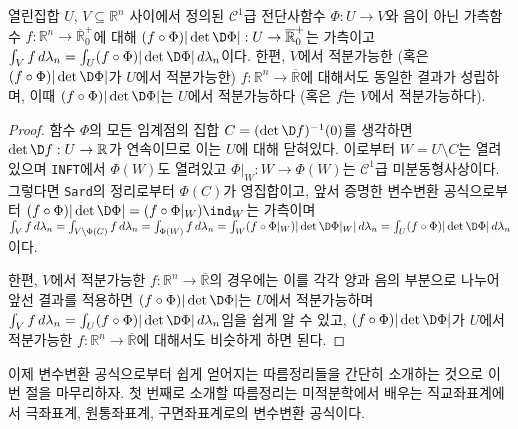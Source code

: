 \begin{corollary}
    열린집합 $U,\,V\subseteq\mathbb{R}^n$ 사이에서 정의된 $\mathcal{C}^1$급 전단사함수 $\Phi:U\to V$와 음이 아닌 가측함수 $f:\mathbb{R}^n\to\overline{\mathbb{R}}^+_0$에 대해 $(f\circ\Phi)|\det\D\Phi|:U\to\overline{\mathbb{R}}^+_0$는 가측이고 $\int_V f\,d\lambda_n=\int_U(f\circ\Phi)|\det\D\Phi|\,d\lambda_n$이다. 한편, $V$에서 적분가능한 (혹은 $(f\circ\Phi)|\det\D\Phi|$가 $U$에서 적분가능한) $f:\mathbb{R}^n\to\overline{\mathbb{R}}$에 대해서도 동일한 결과가 성립하며, 이때 $(f\circ\Phi)|\det\D\Phi|$는 $U$에서 적분가능하다 (혹은 $f$는 $V$에서 적분가능하다).
\end{corollary}

\begin{proof}
    함수 $\Phi$의 모든 임계점의 집합 $C=(\det\D f)^{-1}(0)$를 생각하면 $\det\D f:U\to\mathbb{R}$가 연속이므로 이는 $U$에 대해 닫혀있다. 이로부터 $W=U\setminus C$는 열려있으며 \texttt{INFT}에서 $\Phi(W)$도 열려있고 $\Phi\vert_W:W\to\Phi(W)$는 $\mathcal{C}^1$급 미분동형사상이다. 그렇다면 \texttt{Sard}의 정리로부터 $\Phi(C)$가 영집합이고, 앞서 증명한 변수변환 공식으로부터 $(f\circ\Phi)|\det\D\Phi|=(f\circ\Phi\vert_W)\ind_W$는 가측이며 $\int_V f\,d\lambda_n=\int_{V\setminus\Phi(C)} f\,d\lambda_n=\int_{\Phi(W)} f\,d\lambda_n=\int_W(f\circ\Phi\vert_W)|\det\D\Phi\vert_W|\,d\lambda_n=\int_U(f\circ\Phi)|\det\D\Phi|\,d\lambda_n$이다.
    
    한편, $V$에서 적분가능한 $f:\mathbb{R}^n\to\overline{\mathbb{R}}$의 경우에는 이를 각각 양과 음의 부분으로 나누어 앞선 결과를 적용하면 $(f\circ\Phi)|\det\D\Phi|$는 $U$에서 적분가능하며 $\int_Vf\,d\lambda_n=\int_U(f\circ\Phi)|\det\D\Phi|\,d\lambda_n$임을 쉽게 알 수 있고, $(f\circ\Phi)|\det\D\Phi|$가 $U$에서 적분가능한 $f:\mathbb{R}^n\to\overline{\mathbb{R}}$에 대해서도 비슷하게 하면 된다.
\end{proof}

이제 변수변환 공식으로부터 쉽게 얻어지는 따름정리들을 간단히 소개하는 것으로 이번 절을 마무리하자. 첫 번째로 소개할 따름정리는 미적분학에서 배우는 직교좌표계에서 극좌표계, 원통좌표계, 구면좌표계로의 변수변환 공식이다.

